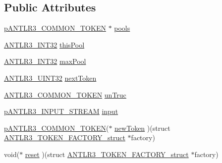 \subsection*{Public Attributes}
\begin{DoxyCompactItemize}
\item 
\hyperlink{antlr3interfaces_8h_adaa6df9cbf0cd7ab37fd545520ff299b}{p\-A\-N\-T\-L\-R3\-\_\-\-C\-O\-M\-M\-O\-N\-\_\-\-T\-O\-K\-E\-N} $\ast$ \hyperlink{struct_a_n_t_l_r3___t_o_k_e_n___f_a_c_t_o_r_y__struct_ab9e726d32971c19670422fc957a4e224}{pools}
\item 
\hyperlink{antlr3defs_8h_a6faef5c4687f8eb633d2aefea93973ca}{A\-N\-T\-L\-R3\-\_\-\-I\-N\-T32} \hyperlink{struct_a_n_t_l_r3___t_o_k_e_n___f_a_c_t_o_r_y__struct_affb2e4b787902103b05789ea9e6df0b6}{this\-Pool}
\item 
\hyperlink{antlr3defs_8h_a6faef5c4687f8eb633d2aefea93973ca}{A\-N\-T\-L\-R3\-\_\-\-I\-N\-T32} \hyperlink{struct_a_n_t_l_r3___t_o_k_e_n___f_a_c_t_o_r_y__struct_a19bec4eaa4b7a97b302d44864e929263}{max\-Pool}
\item 
\hyperlink{antlr3defs_8h_ac41f744abd0fd25144b9eb9d11b1dfd1}{A\-N\-T\-L\-R3\-\_\-\-U\-I\-N\-T32} \hyperlink{struct_a_n_t_l_r3___t_o_k_e_n___f_a_c_t_o_r_y__struct_a80b13cdd84923d749e14df702a03664d}{next\-Token}
\item 
\hyperlink{antlr3commontoken_8h_ab35c5fc3921ac6bfa1dbb31681aa9a0f}{A\-N\-T\-L\-R3\-\_\-\-C\-O\-M\-M\-O\-N\-\_\-\-T\-O\-K\-E\-N} \hyperlink{struct_a_n_t_l_r3___t_o_k_e_n___f_a_c_t_o_r_y__struct_a8047d14d770f3d37823460a61d2263b8}{un\-Truc}
\item 
\hyperlink{antlr3interfaces_8h_a30a8f71f3e04066360723d538fd67f16}{p\-A\-N\-T\-L\-R3\-\_\-\-I\-N\-P\-U\-T\-\_\-\-S\-T\-R\-E\-A\-M} \hyperlink{struct_a_n_t_l_r3___t_o_k_e_n___f_a_c_t_o_r_y__struct_a5eb7471ee5333de2b227ffea4efa6053}{input}
\item 
\hyperlink{antlr3interfaces_8h_adaa6df9cbf0cd7ab37fd545520ff299b}{p\-A\-N\-T\-L\-R3\-\_\-\-C\-O\-M\-M\-O\-N\-\_\-\-T\-O\-K\-E\-N}($\ast$ \hyperlink{struct_a_n_t_l_r3___t_o_k_e_n___f_a_c_t_o_r_y__struct_a111fabbe4ff4fd673d2bda2bc6e0165f}{new\-Token} )(struct \hyperlink{struct_a_n_t_l_r3___t_o_k_e_n___f_a_c_t_o_r_y__struct}{A\-N\-T\-L\-R3\-\_\-\-T\-O\-K\-E\-N\-\_\-\-F\-A\-C\-T\-O\-R\-Y\-\_\-struct} $\ast$factory)
\item 
void($\ast$ \hyperlink{struct_a_n_t_l_r3___t_o_k_e_n___f_a_c_t_o_r_y__struct_a8ca6227695d2d0bbcbe4bfa6dfc719f7}{reset} )(struct \hyperlink{struct_a_n_t_l_r3___t_o_k_e_n___f_a_c_t_o_r_y__struct}{A\-N\-T\-L\-R3\-\_\-\-T\-O\-K\-E\-N\-\_\-\-F\-A\-C\-T\-O\-R\-Y\-\_\-struct} $\ast$factory)

\end{DoxyCompactItemize}
